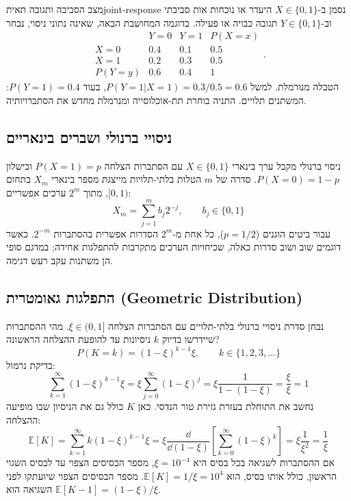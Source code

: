 \begin{example}{מצב הסביבה ותגובה תאית}{joint-response}
נסמן ב-$X\in\{0,1\}$ היעדר או נוכחות אות סביבתי וב-$Y\in\{0,1\}$ תגובה כבויה או פעילה. בדוגמה המחושבת הבאה, שאינה נתוני ניסוי, נבחר
\begin{equation}\label{eq:joint-response-table}
\begin{array}{c|cc|c}
 &Y=0&Y=1&P(X=x)\\\hline
X=0&0.4&0.1&0.5\\
X=1&0.2&0.3&0.5\\\hline
P(Y=y)&0.6&0.4&1
\end{array}.
\end{equation}
הטבלה מנורמלת. למשל $P(Y=1|X=1)=0.3/0.5=0.6$, בעוד $P(Y=1)=0.4$: המשתנים תלויים. התניה בוחרת תת-אוכלוסייה ומנרמלת מחדש את הסתברויותיה.
\end{example}

\subsection{ניסויי ברנולי ושברים בינאריים}
ניסוי ברנולי מקבל ערך בינארי $X \in \{0, 1\}$ עם הסתברות הצלחה $P(X=1) = p$ וכישלון $P(X=0) = 1-p$.
סדרה של $m$ הטלות בלתי-תלויות מייצגת מספר בינארי $X_m$ בתחום $[0,1)$, מתוך $2^m$ ערכים אפשריים:
\begin{equation}
X_m = \sum_{j=1}^m b_j 2^{-j}, \qquad b_j \in \{0, 1\}
\end{equation}
עבור ביטים הוגנים ($p=1/2$), כל אחת מ-$2^m$ הסדרות אפשרית בהסתברות $2^{-m}$. כאשר דוגמים שוב ושוב סדרות כאלה, שכיחויות הערכים מתקרבות להתפלגות אחידה; במדגם סופי הן משתנות עקב רעש דגימה.

\subsection{התפלגות גאומטרית (\texorpdfstring{\textenglish{Geometric Distribution}}{Geometric Distribution})}
נבחן סדרת ניסויי ברנולי בלתי-תלויים עם הסתברות הצלחה $\xi \in (0, 1]$. מהי ההסתברות שיידרשו בדיוק $k$ ניסיונות עד להופעת ההצלחה הראשונה?
\begin{equation}\label{eq:geometric-pmf}
P(K = k) = (1-\xi)^{k-1} \xi, \qquad k \in \{1, 2, 3, \dots\}
\end{equation}
בדיקת נרמול:
\begin{equation}
\sum_{k=1}^\infty (1-\xi)^{k-1}\xi = \xi \sum_{j=0}^\infty (1-\xi)^j = \xi \frac{1}{1 - (1-\xi)} = \frac{\xi}{\xi} = 1
\end{equation}
נחשב את התוחלת בעזרת גזירת טור הנדסי. כאן $K$ כולל גם את הניסיון שבו מופיעה ההצלחה:
\begin{equation}
\mathbb{E}[K] = \sum_{k=1}^\infty k (1-\xi)^{k-1}\xi = \xi \frac{\dd}{\dd (1-\xi)}\left[ \sum_{k=0}^\infty (1-\xi)^k \right] = \xi \frac{1}{\xi^2} = \frac{1}{\xi}
\end{equation}
אם ההסתברות לשגיאה בכל בסיס היא $\xi = 10^{-4}$, מספר הבסיסים הצפוי עד לבסיס השגוי הראשון, כולל אותו בסיס, הוא $\mathbb{E}[K]=1/\xi=10^4$. מספר הבסיסים הצפוי שיועתקו לפני השגיאה הוא $\mathbb{E}[K-1]=(1-\xi)/\xi$.

